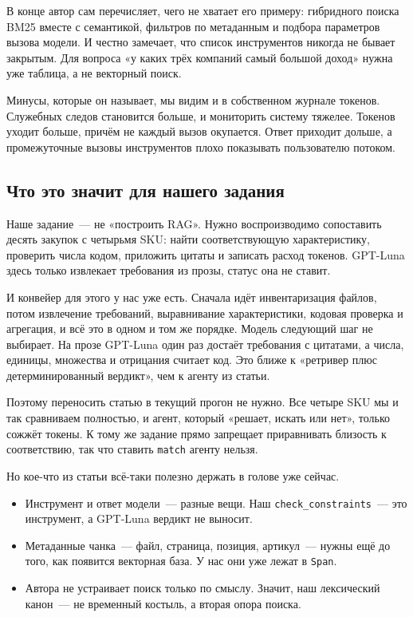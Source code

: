 \documentclass[11pt,a4paper]{article}
\begin{document}
В конце автор сам перечисляет, чего не хватает его примеру: гибридного поиска BM25 вместе с семантикой, фильтров по метаданным и подбора параметров вызова модели. И честно замечает, что список инструментов никогда не бывает закрытым. Для вопроса «у каких трёх компаний самый большой доход» нужна уже таблица, а не векторный поиск.

Минусы, которые он называет, мы видим и в собственном журнале токенов. Служебных следов становится больше, и мониторить систему тяжелее. Токенов уходит больше, причём не каждый вызов окупается. Ответ приходит дольше, а промежуточные вызовы инструментов плохо показывать пользователю потоком.

\subsection*{Что это значит для нашего задания}

Наше задание~--- не «построить RAG». Нужно воспроизводимо сопоставить десять закупок с четырьмя SKU: найти соответствующую характеристику, проверить числа кодом, приложить цитаты и записать расход токенов. GPT-Luna здесь только извлекает требования из прозы, статус она не ставит.

И конвейер для этого у нас уже есть. Сначала идёт инвентаризация файлов, потом извлечение требований, выравнивание характеристики, кодовая проверка и агрегация, и всё это в одном и том же порядке. Модель следующий шаг не выбирает. На прозе GPT-Luna один раз достаёт требования с цитатами, а числа, единицы, множества и отрицания считает код. Это ближе к «ретривер плюс детерминированный вердикт», чем к агенту из статьи.

Поэтому переносить статью в текущий прогон не нужно. Все четыре SKU мы и так сравниваем полностью, и агент, который «решает, искать или нет», только сожжёт токены. К тому же задание прямо запрещает приравнивать близость к соответствию, так что ставить \texttt{match} агенту нельзя.

Но кое-что из статьи всё-таки полезно держать в голове уже сейчас.

\begin{itemize}
  \item Инструмент и ответ модели~--- разные вещи. Наш \texttt{check\_constraints}~--- это инструмент, а GPT-Luna вердикт не выносит.
  \item Метаданные чанка~--- файл, страница, позиция, артикул~--- нужны ещё до того, как появится векторная база. У нас они уже лежат в \texttt{Span}.
  \item Автора не устраивает поиск только по смыслу. Значит, наш лексический канон~--- не временный костыль, а вторая опора поиска.
\end{itemize}
\end{document}

